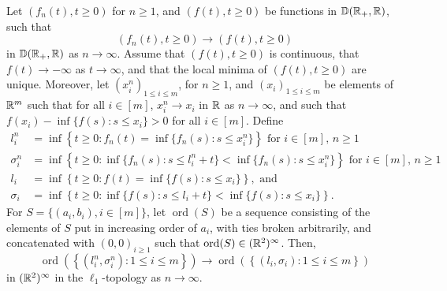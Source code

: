 \begin{lemma}\label{lemma.extractexcursions}
Let $(f_n(t), t\geq 0)$ for $n\geq 1$, and $(f(t),t\geq 0)$ be functions in ${\mathbb D}({\mathbb R}_+,{\mathbb R})$, such that 
$$(f_n(t), t\geq 0)\to (f(t),t\geq 0)$$ in ${\mathbb D}({\mathbb R}_+,{\mathbb R})$ as $n\to \infty$. Assume that $(f(t),t\geq 0)$ is continuous, that $f(t)\to -\infty$ as $t\to \infty$, and that the local minima of $(f(t),t\geq 0)$ are unique. Moreover, let $(x_i^n)_{1\leq i\leq m}$, for $n\geq 1$, and $(x_i)_{1\leq i\leq m}$ be elements of ${\mathbb R}^{m}$ such that for all $i\in [m]$, $x_i^n\to x_i$ in ${\mathbb R}$ as $n\to \infty$, and such that $f(x_i)-\inf\{f(s):s\leq x_i\}>0$ for all $i\in [m]$. Define
\begin{align*}l_i^n&=\inf\left\{t\geq 0:f_n(t)=\inf\{f_n(s):s\leq x_i^n\}\right\}\text{ for }i\in [m]\text{, }n\geq 1\\
\sigma_i^n&=\inf\left\{ t\geq 0: \inf\{f_n(s):s\leq l_i^n+t\} < \inf\{f_n(s):s\leq x_i^n\}\right\}\text{ for }i\in [m]\text{, }n\geq 1\\
l_i&=\inf\left\{t\geq 0:f(t)=\inf\{f(s):s\leq x_i\}\right\},\text{ and}\\
\sigma_i&=\inf\left\{ t\geq 0: \inf\{f(s):s\leq l_i+ t\} < \inf\{f(s):s\leq x_i\}\right\}.
\end{align*}
For $S=\{(a_i,b_i), i\in [m]\}$, let $\operatorname{ord}(S)$ be a sequence consisting of the elements of $S$ put in increasing order of $a_i$, with ties broken arbitrarily, and concatenated with $(0,0)_{i\geq 1}$ such that $\operatorname{ord}(S)\in ({\mathbb R}^2)^\infty$. Then, 
$$\operatorname{ord}\left(\left\{(l_i^n,\sigma_i^n):1\leq i \leq m\right\}\right)\to \operatorname{ord}\left(\left\{(l_i,\sigma_i):1\leq i \leq m\right\}\right)$$
in $({\mathbb R}^{2})^\infty$ in the $\ell_1$-topology as $n\to \infty$. 
\end{lemma}
